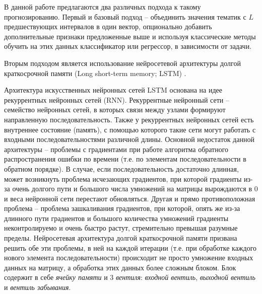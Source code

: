 В данной работе предлагаются два различных подхода к такому прогнозированию. Первый и базовый подход -- объединить значения тематик с $L$ предшествующих интервалов в один вектор, опционально добавить дополнительные признаки предложенные выше и используя классические методы обучить на этих данных классификатор или регрессор, в зависимости от задачи.

Вторым подходом является использование нейросетевой архитектуры долгой краткосрочной памяти (Long short-term memory; LSTM) \cite{lstm_orig} .

Архитектура искусственных нейронных сетей LSTM основана на идее рекуррентных нейронных сетей (RNN). Рекуррентные нейронный сети -- семейство нейронных сетей, в которых связи между узлами формируют направленную последовательность. Также у рекуррентных нейронных сетей есть внутреннее состояние  (память), с помощью которого такие сети могут работать с входными последовательностями различной длины. Основной недостаток данной архитектуры -- проблемы с градиентами при работе алгоритма обратного распространения ошибки по времени (т.е. по элементам последовательности в обратном порядке). В случае, если последовательность достаточно длинная, может возникнуть проблема исчезающих градиентов, при которой градиенты из-за очень долгого пути и большого числа умножений на матрицы вырождаются в 0 и веса нейронной сети перестают обновляться. Другая и прямо противоположная проблема -- проблема зашкаливания градиентов, при которой, опять же из-за длинного пути градиентов и большого количества умножений градиенты неконтролируемо и очень быстро растут, стремительно превышая разумные пределы. Нейросетевая архитектура долгой краткосрочной памяти призвана решить обе эти проблемы, в ней на каждой итерации (т.е. при обработке каждого нового элемента последовательности) происходит не просто умножение входных данных на матрицу, а обработка этих данных более сложным блоком. Блок содержит в себе \textit{ячейку памяти} и 3 \textit{вентиля}: \textit{входной вентиль}, \textit{выходной вентиль} и \textit{вентиль забывания}. 

